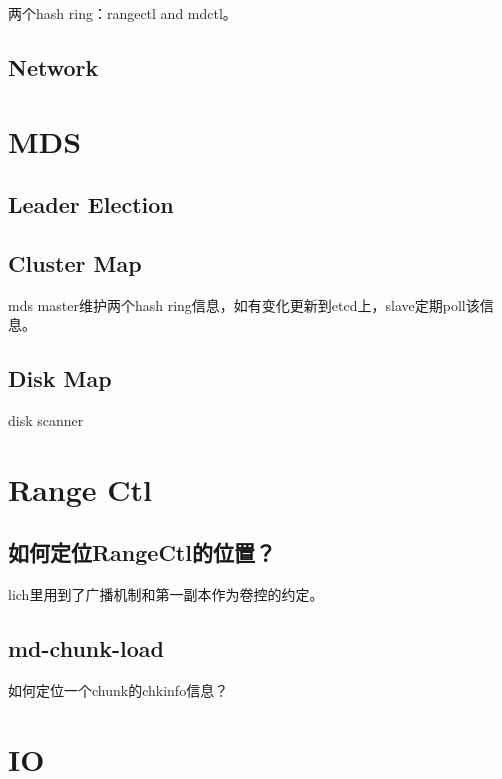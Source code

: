 两个hash ring：rangectl and mdctl。

\subsection{Network}


\section{MDS}

\subsection{Leader Election}

\subsection{Cluster Map}



mds master维护两个hash ring信息，如有变化更新到etcd上，slave定期poll该信息。

\subsection{Disk Map}

disk scanner

\section{Range Ctl}

\subsection{如何定位RangeCtl的位置？}

lich里用到了广播机制和第一副本作为卷控的约定。

\subsection{md-chunk-load}

如何定位一个chunk的chkinfo信息？


\section{IO}

